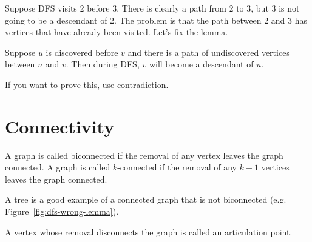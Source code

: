 Suppose DFS visits 2 before 3. There is clearly a path from 2 to 3, 
but 3 is not going to be a descendant of 2. The problem is that the
path between 2 and 3 has vertices that have already been visited.
Let's fix the lemma.

\begin{lemma}
    Suppose $u$ is discovered before $v$ and there is a
    path of undiscovered vertices between $u$ and $v$. Then during
    DFS, $v$ will become a
    descendant of $u$.
\end{lemma}

If you want to prove this, use contradiction.

\section{Connectivity}

\begin{definition}
    A graph is called biconnected if the removal of any vertex leaves
    the graph connected. A graph is called $k$-connected if the
    removal of any $k - 1$ vertices leaves the graph connected.
\end{definition}

A tree is a good example of a connected graph that is not biconnected
(e.g. Figure~\ref{fig:dfs-wrong-lemma}).

\begin{definition}
    A vertex whose removal disconnects the graph is called an
    articulation point.
\end{definition}
 














